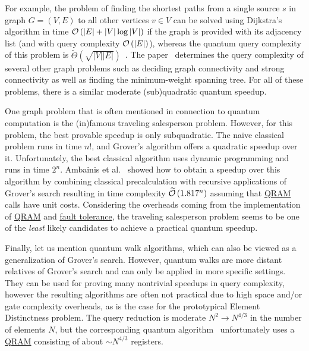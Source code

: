 \begin{refsection}
	For example, the problem of finding the shortest paths from a single source $s$ in graph $G=(V,E)$ to all other vertices $v\in V$ can be solved using Dijkstra's algorithm in time $\mathcal{O}\left( |E|+|V|\log|V| \right)$ if the graph is provided with its adjacency list (and with query complexity $\mathcal{O}\left( |E| \right)$), whereas the quantum query complexity of this problem is $\widetilde{\Theta}(\sqrt{|V||E|})$~\cite{durr2004QQueryCompGraph}. The paper~\cite{durr2004QQueryCompGraph} determines the query complexity of several other graph problems such as deciding graph connectivity and strong connectivity as well as finding the minimum-weight spanning tree. For all of these problems, there is a similar moderate (sub)quadratic quantum speedup.
	
	One graph problem that is often mentioned in connection to quantum computation is the (in)famous traveling salesperson problem. However, for this problem, the best provable speedup is only subquadratic. The naive classical problem runs in time $n!$, and Grover's algorithm offers a quadratic speedup over it. Unfortunately, the best classical algorithm uses dynamic programming and runs in time $2^n$. Ambainis et al.~\cite{ambainis2019QSpeedUpExpTimeDPAlgs} showed how to obtain a speedup over this algorithm by combining classical precalculation with recursive applications of Grover’s search resulting in time complexity $\widetilde{\mathcal{O}}\left( 1.817^n \right)$ assuming that \hyperref[prim:QRAM]{QRAM} calls have unit costs. Considering the overheads coming from the implementation of \hyperref[prim:QRAM]{QRAM} and \hyperref[prim:FTQC]{fault tolerance}, the traveling salesperson problem seems to be one of the \textit{least} likely candidates to achieve a practical quantum speedup. 
	
	Finally, let us mention quantum walk algorithms, which can also be viewed as a generalization of Grover's search. However, quantum walks are more distant relatives of Grover's search and can only be applied in more specific settings. They can be used for proving many nontrivial speedups in query complexity, however the resulting algorithms are often not practical due to high space and/or gate complexity overheads, as is the case for the prototypical Element Distinctness problem. The query reduction is moderate $N^2\rightarrow N^{4/3}$ in the number of elements $N$, but the corresponding quantum algorithm~\cite{ambainis2004QWalkForElementDist} unfortunately uses a \hyperref[prim:QRAM]{QRAM} consisting of about $\sim N^{4/3}$ registers.
	

\end{refsection}
